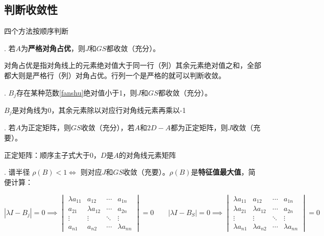 \subsection{判断收敛性}

四个方法按顺序判断

. 若$A$为\textbf{严格对角占优}，则$J$和$GS$都收敛（充分）。

对角占优是指对角线上的元素绝对值大于同一行（列）其余元素绝对值之和，全部都大则是严格行（列）对角占优。行列一个是严格的就可以判断收敛。

. $B_j$存在某种范数\ref{fanshu}绝对值小于1，则$J$和$GS$都收敛（充分）。

$B_j$是对角线为0，其余元素除以对应行对角线元素再乘以-1

. 若$A$为正定矩阵，则$GS$收敛（充分），若$A$和$2D-A$都为正定矩阵，则$J$收敛（充要）。

正定矩阵：顺序主子式大于0，\quad $D$是$A$的对角线元素矩阵

. 谱半径 $\rho(B) < 1 \iff$ 则对应$J$和$GS$收敛（充要）。\quad $\rho(B)$是\textbf{特征值最大值}，简便计算：

\[
|\lambda I - B_j| = 0 \implies
\begin{vmatrix}
\lambda a_{11} & a_{12} & \cdots & a_{1n} \\
a_{21} & \lambda a_{12} & \cdots & a_{2n} \\
\vdots & \vdots & \ddots & \vdots \\
a_{n1} & a_{n2} & \cdots & \lambda a_{nn}
\end{vmatrix}
= 0
\quad \quad
|\lambda I - B_S| = 0 \implies
\begin{vmatrix}
\lambda a_{11} & a_{12} & \cdots & a_{1n} \\
\lambda a_{21} & \lambda a_{12} & \cdots & a_{2n} \\
\vdots & \vdots & \ddots & \vdots \\
\lambda a_{n1} & \lambda a_{n2} & \cdots & \lambda a_{nn}
\end{vmatrix}
= 0
\]